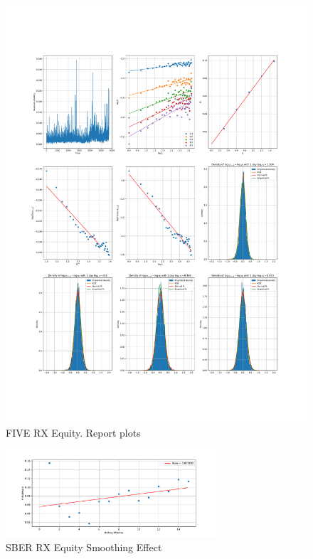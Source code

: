     \begin{figure}[h]
        \centering
        \includegraphics[width=\textwidth]{fig/FIVE RX Equity.pdf}
        \caption{FIVE RX Equity. Report plots}
    \end{figure}



    \begin{figure}[h]
        \centering
        \includegraphics[width=0.7\textwidth]{fig/SBER RX Equity Smoothing Effect.pdf}
        \caption{SBER RX Equity Smoothing Effect}
    \end{figure}

